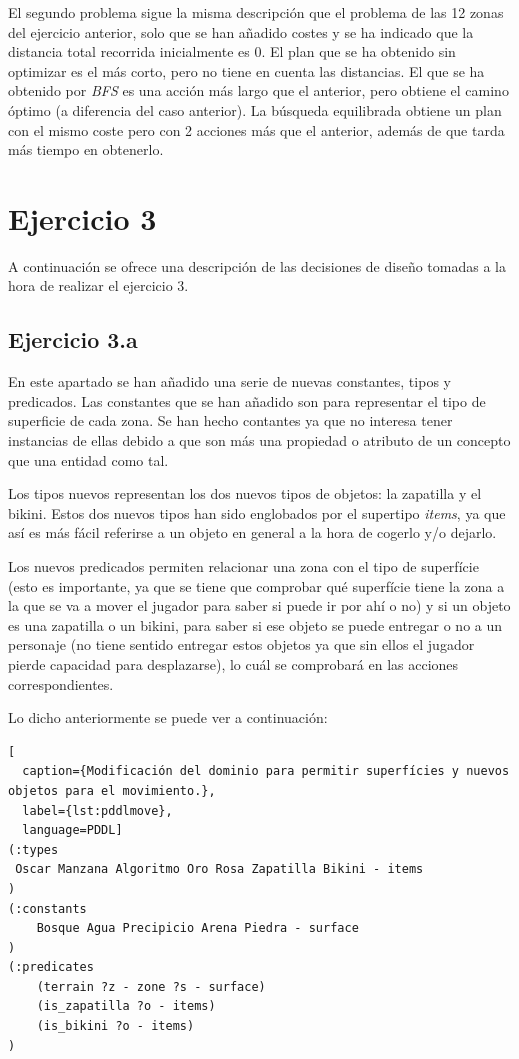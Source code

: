 \documentclass[11pt,a4paper]{article}
\begin{document}
El segundo problema sigue la misma descripción que el problema de las 12 zonas del ejercicio anterior, solo que se han añadido costes
y se ha indicado que la distancia total recorrida inicialmente es 0.
El plan que se ha obtenido sin optimizar es el más corto, pero no tiene en cuenta las distancias. El que se ha obtenido por
\textit{BFS} es una acción más largo que el anterior, pero obtiene el camino óptimo (a diferencia del caso anterior). La búsqueda
equilibrada obtiene un plan con el mismo coste pero con 2 acciones más que el anterior, además de que tarda más tiempo en obtenerlo.

\section{Ejercicio 3}

A continuación se ofrece una descripción de las decisiones de diseño tomadas a la hora de realizar el ejercicio 3.

\subsection{Ejercicio 3.a}

En este apartado se han añadido una serie de nuevas constantes, tipos y predicados. Las constantes que se han añadido son para
representar el tipo de superficie de cada zona. Se han hecho contantes ya que no interesa tener instancias de ellas debido a que son
más una propiedad o atributo de un concepto que una entidad como tal.

Los tipos nuevos representan los dos nuevos tipos de objetos: la zapatilla y el bikini. Estos dos nuevos tipos han sido
englobados por el supertipo \textit{items}, ya que así es más fácil referirse a un objeto en general a la hora de cogerlo y/o dejarlo.

Los nuevos predicados permiten relacionar una zona con el tipo de superfície (esto es importante, ya que se tiene que comprobar qué
superfície tiene la zona a la que se va a mover el jugador para saber si puede ir por ahí o no) y si un objeto es una zapatilla o
un bikini, para saber si ese objeto se puede entregar o no a un personaje (no tiene sentido entregar estos objetos ya que sin ellos
el jugador pierde capacidad para desplazarse), lo cuál se comprobará en las acciones correspondientes.

Lo dicho anteriormente se puede ver a continuación:

\begin{algorithm}[H]
\begin{lstlisting}[
  caption={Modificación del dominio para permitir superfícies y nuevos objetos para el movimiento.},
  label={lst:pddlmove},
  language=PDDL]
(:types
 Oscar Manzana Algoritmo Oro Rosa Zapatilla Bikini - items
)
(:constants
	Bosque Agua Precipicio Arena Piedra - surface
)
(:predicates
	(terrain ?z - zone ?s - surface)
	(is_zapatilla ?o - items)
	(is_bikini ?o - items)
)
\end{lstlisting}
\end{algorithm}
\end{document}
